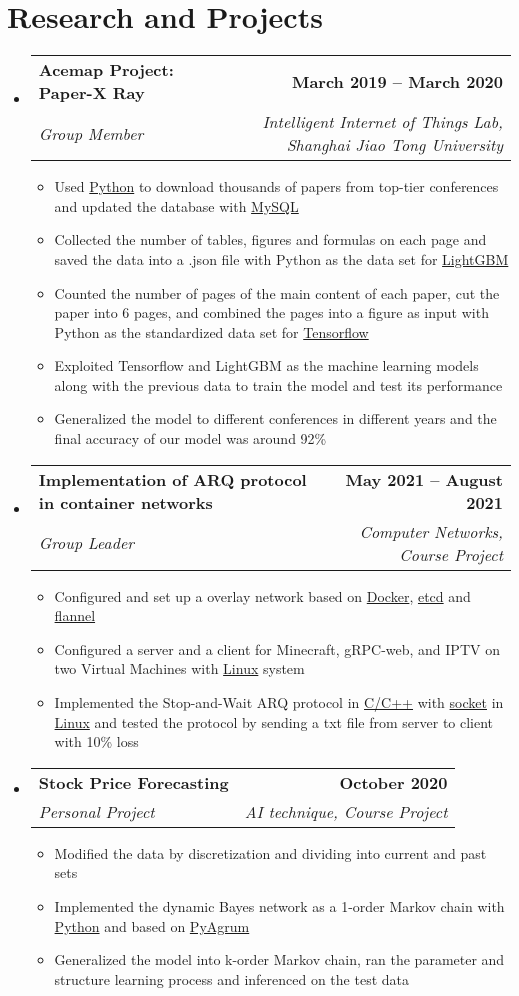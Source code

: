 \documentclass[letterpaper,11pt]{article}
\makeatletter
\newcommand{\resumeItem}[1]{
  \item\small{
    {#1 \vspace{-2pt}}
  }
}
\newcommand{\resumeSubheading}[4]{
  \vspace{-2pt}\item
    \begin{tabular*}{1.0\textwidth}[t]{l@{\extracolsep{\fill}}r}
      \textbf{#1} & \textbf{\small #2} \\
      \textit{\small#3} & \textit{\small #4} \\
    \end{tabular*}\vspace{-10pt}
}
\newcommand{\resumeSubHeadingListStart}{\begin{itemize}[leftmargin=0.0in, label={}]}
\newcommand{\resumeSubHeadingListEnd}{\end{itemize}}
\newcommand{\resumeItemListStart}{\begin{itemize}}
\newcommand{\resumeItemListEnd}{\end{itemize}\vspace{-5pt}}
\makeatother
\begin{document}
\section{Research and Projects}
    \resumeSubHeadingListStart
      \resumeSubheading
          {Acemap Project: Paper-X Ray}{March 2019 -- March 2020}
          {Group Member}{Intelligent Internet of Things Lab, Shanghai Jiao Tong University}
          \vspace{0.3pt}
          \resumeItemListStart
            \resumeItem{Used \underline{Python} to download thousands of papers from top-tier conferences and updated the database with \underline{MySQL}}
            \resumeItem{Collected the number of tables, figures and formulas on each page and saved the data into a .json file with Python as the data set for \underline{LightGBM}}
            \resumeItem{Counted the number of pages of the main content of each paper, cut the paper into 6 pages, and combined the pages
into a figure as input with Python as the standardized data set for \underline{Tensorflow}}
            \resumeItem{Exploited Tensorflow and LightGBM as the machine learning models along with the previous data to train the model and
test its performance}
            \resumeItem{Generalized the model to different conferences in different years and the final accuracy of our model was around 92\%}
          \resumeItemListEnd
      \resumeSubheading
          {Implementation of ARQ protocol in container networks}{May 2021 -- August 2021}
          {Group Leader}{Computer Networks, Course Project}
          \vspace{0.3pt}
          \resumeItemListStart
            \resumeItem{Configured and set up a overlay network based on \underline{Docker}, \underline{etcd} and \underline{flannel}}
            \resumeItem{Configured a server and a client for Minecraft, gRPC-web, and IPTV on two Virtual Machines with \underline{Linux} system}
            \resumeItem{Implemented the Stop-and-Wait ARQ protocol in \underline{C/C++} with \underline{socket} in \underline{Linux} and tested the protocol by sending a txt file from server to client with 10\% loss}
          \resumeItemListEnd 
          \resumeSubheading
          {Stock Price Forecasting}{October 2020}
          {Personal Project}{AI technique, Course Project}
          \vspace{0.3pt}
          \resumeItemListStart
            \resumeItem{Modified the data by discretization and dividing into current and past sets}
            \resumeItem{Implemented the dynamic Bayes network as a 1-order Markov chain with \underline{Python} and based on \underline{PyAgrum}}
            \resumeItem{Generalized the model into k-order Markov chain, ran the parameter and structure learning process and inferenced on the test data}
          \resumeItemListEnd 
    \resumeSubHeadingListEnd
\vspace{-12pt}
\end{document}
